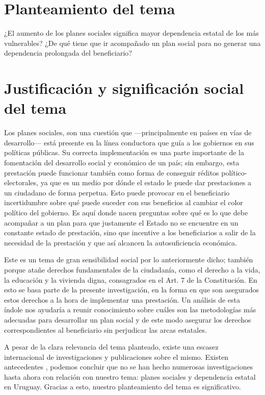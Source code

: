 \documentclass{article}
\begin{document}
\section{Planteamiento del tema}

¿El aumento de los planes sociales significa mayor dependencia estatal de los más vulnerables? ¿De qué tiene que ir acompañado un plan social para no generar una dependencia prolongada del beneficiario?

\section{Justificación y significación social del tema}

Los planes sociales, son una cuestión que —principalmente en países en vías de desarrollo— está presente en la línea conductora que guía a los gobiernos en sus políticas públicas. Su correcta implementación es una parte importante de la fomentación del desarrollo social y económico de un país; sin embargo, esta prestación puede funcionar también como forma de conseguir réditos político-electorales, ya que es un medio por dónde el estado le puede dar prestaciones a un ciudadano de forma perpetua. Esto puede provocar en el beneficiario incertidumbre sobre qué puede suceder con sus beneficios al cambiar el color político del gobierno. Es aquí donde nacen preguntas sobre qué es lo que debe acompañar a un plan para que justamente el Estado no se encuentre en un constante estado de prestación, sino que incentive a los beneficiarios a salir de la necesidad de la prestación y que así alcancen la autosuficiencia económica.

Este es un tema de gran sensibilidad social por lo anteriormente dicho; también porque atañe derechos fundamentales de la ciudadanía, como el derecho a la vida, la educación y la vivienda digna, consagrados en el Art. 7 de la Constitución. En esto se basa parte de la presente investigación, en la forma en que son asegurados estos derechos a la hora de implementar una prestación. Un análisis de esta índole nos ayudaría a reunir conocimiento sobre cuáles son las metodologías más adecuadas para desarrollar un plan social y de este modo asegurar los derechos correspondientes al beneficiario sin perjudicar las arcas estatales.

A pesar de la clara relevancia del tema planteado, existe una escasez internacional de investigaciones y publicaciones sobre el mismo. Existen antecedentes , podemos concluir que no se han hecho numerosas investigaciones hasta ahora con relación con nuestro tema: planes sociales y dependencia estatal en Uruguay. Gracias a esto, nuestro planteamiento del tema es significativo.
\end{document}
